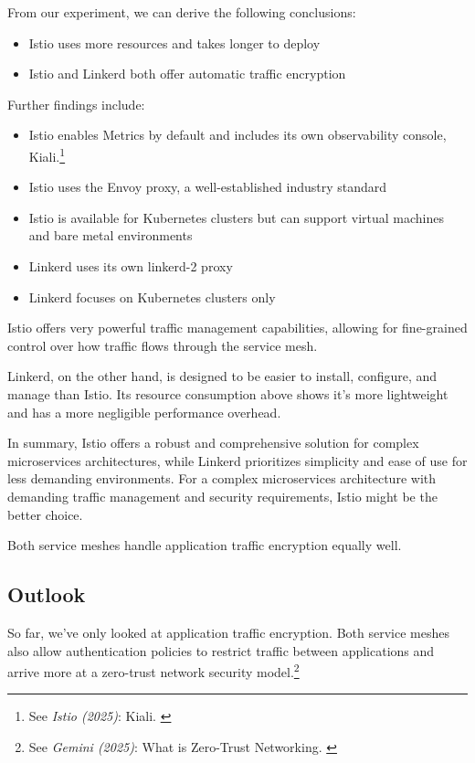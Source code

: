 From our experiment, we can derive the following conclusions:

\begin{itemize}
    \item Istio uses more resources and takes longer to deploy
    \item Istio and Linkerd both offer automatic traffic encryption
\end{itemize}

Further findings include:

\begin{itemize}
    \item Istio enables Metrics by default and includes its own observability console, Kiali.\footnote{See \textit{Istio (2025)}: Kiali. \cite{istioKiali}}
    \item Istio uses the Envoy proxy, a well-established industry standard
    \item Istio is available for Kubernetes clusters but can support virtual machines and bare metal environments
    \item Linkerd uses its own linkerd-2 proxy
    \item Linkerd focuses on Kubernetes clusters only
\end{itemize}

Istio offers very powerful traffic management capabilities, allowing for fine-grained control over how traffic flows through the service mesh.

Linkerd, on the other hand, is designed to be easier to install, configure, and manage than Istio. Its resource consumption above shows it's more lightweight and has a more negligible performance overhead.

In summary, Istio offers a robust and comprehensive solution for complex microservices architectures, while Linkerd prioritizes simplicity and ease of use for less demanding environments. For a complex microservices architecture with demanding traffic management and security requirements, Istio might be the better choice.

Both service meshes handle application traffic encryption equally well.

\subsection{Outlook}

So far, we've only looked at application traffic encryption. Both service meshes also allow authentication policies to restrict traffic between applications and arrive more at a zero-trust network security model.\footnote{See \textit{Gemini (2025)}: What is Zero-Trust Networking. \cite{bardZeroTrust}} 

